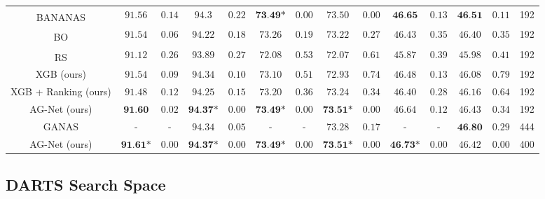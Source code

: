 \documentclass[runningheads]{llncs}
\begin{document}
\begin{table*}[ht]
\begin{center}
{\begin{tabular}{c||c|c|c|c||c|c|c|c||c|c|c|c||c}
				\midrule
				BANANAS\textsuperscript{\textdagger} \cite{2021BANANAS}  & $91.56 $&$ 0.14$ & $94.3 $&$0.22$ & $\textbf{73.49*} $&$ 0.00$ & $73.50 $&$ 0.00$ & $\textbf{46.65} $&$ 0.13$& $\textbf{46.51} $&$ 0.11 $ & 192 \\
				BO\textsuperscript{\textdagger}  \cite{2015DNGO}  & $91.54$&$ 0.06$  & $94.22$&$ 0.18$ & $73.26 $&$ 0.19$ & $73.22 $&$ 0.27$ &  $46.43 $&$ 0.35$  & $46.40 $&$ 0.35$ & 192 \\
				RS \textsuperscript{\textdagger} \cite{2019RS}   & $91.12 $&$ 0.26$ & $93.89 $&$ 0.27$ & $72.08 $&$ 0.53$ & $72.07 $&$ 0.61$ & $45.87 $&$ 0.39$ & $45.98 $&$ 0.41$ & 192  \\
				XGB (ours) & $91.54 $&$ 0.09$ & $94.34 $&$ 0.10 $ & $73.10 $&$ 0.51 $ & $72.93 $&$ 0.74 $ &  $46.48 $&$ 0.13$  & $46.08 $&$ 0.79$ & 192  \\
				XGB + Ranking (ours) & $91.48 $&$ 0.12 $ & $94.25 $&$ 0.15$ & $73.20  $&$ 0.36$ & $73.24  $&$ 0.34$ & $46.40 $&$ 0.28$ & $46.16 $&$ 0.64$ & 192 \\
				AG-Net (ours) & $\textbf{91.60} $&$ 0.02 $ & $\textbf{94.37*} $&$ 0.00$ & $\textbf{73.49*} $&$ 0.00$ & $\textbf{73.51*} $&$ 0.00$ & $46.64 $&$ 0.12$ & $46.43 $&$ 0.34$ &192  \\
				\midrule
				GANAS \cite{2021GANAS}& - & - & $94.34$&$ 0.05$  &- & - & $73.28 $&$ 0.17$ & - &- & $\textbf{46.80} $&$ 0.29$ & 444  \\
				AG-Net (ours) & $\textbf{91.61*} $&$ 0.00$ & $\textbf{94.37*} $&$ 0.00$   &  $\textbf{73.49*} $&$ 0.00$ & $\textbf{73.51*} $&$ 0.00$ &  $\textbf{46.73*} $&$ 0.00$ & $46.42 $&$ 0.00$ & 400  \\
				\bottomrule
		\end{tabular}}
	\end{center}
\end{table*}


\subsection{DARTS Search Space}\label{sec:supp_darts}
\end{document}
